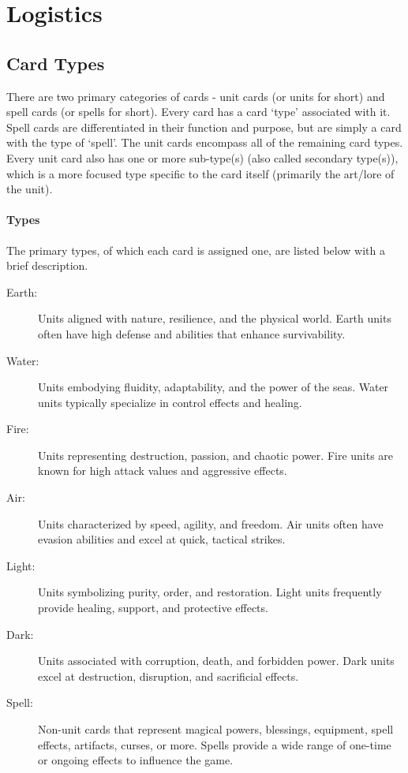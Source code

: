\chapter{Logistics}





\section{Card Types}

There are two primary categories of cards - unit cards (or units for short) and spell cards (or spells for short). Every card has a card `type' associated with it. Spell cards are differentiated in their function and purpose, but are simply a card with the type of `spell'. The unit cards encompass all of the remaining card types. Every unit card also has one or more sub-type(s) (also called secondary type(s)), which is a more focused type specific to the card itself (primarily the art/lore of the unit).

\subsubsection{Types}
The primary types, of which each card is assigned one, are listed below with a brief description.
\begin{description}
  \item[Earth:] Units aligned with nature, resilience, and the physical world. Earth units often have high defense and abilities that enhance survivability.
  \item[Water:] Units embodying fluidity, adaptability, and the power of the seas. Water units typically specialize in control effects and healing.
  \item[Fire:] Units representing destruction, passion, and chaotic power. Fire units are known for high attack values and aggressive effects.
  \item[Air:] Units characterized by speed, agility, and freedom. Air units often have evasion abilities and excel at quick, tactical strikes.
  \item[Light:] Units symbolizing purity, order, and restoration. Light units frequently provide healing, support, and protective effects.
  \item[Dark:] Units associated with corruption, death, and forbidden power. Dark units excel at destruction, disruption, and sacrificial effects.
  \item[Spell:] Non-unit cards that represent magical powers, blessings, equipment, spell effects, artifacts, curses, or more. Spells provide a wide range of one-time or ongoing effects to influence the game.
\end{description}

